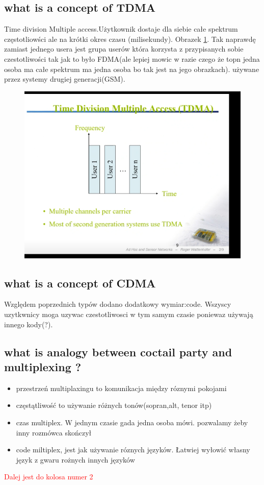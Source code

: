 \subsection{what is a concept of TDMA}
Time division Multiple access.Użytkownik dostaje dla siebie całe spektrum częstotliowści ale na krótki okres czasu (milisekundy). Obrazek \ref{zdj:TDMA}. Tak naprawdę zamiast jednego usera jest grupa userów która korzysta z przypisanych sobie czestotliwości tak jak to było FDMA(ale lepiej mowic w razie czego że topn jedna osoba ma całe spektrum ma jedna osoba bo tak jest na jego obrazkach). używane przez systemy drugiej generacji(GSM). 
\begin{figure}

\caption{}
\label{zdj:TDMA}
\centering
\includegraphics[width=\textwidth]{zdjecia/TDMA}
\end{figure}
\subsection{what is a concept of CDMA}
Względem poprzednich typów dodano dodatkowy wymiar:code. Wszyscy uzytkwnicy moga uzywac czestotliwosci w tym samym czasie poniewaz używają innego kody(?).


\subsection{what is analogy between coctail party and multiplexing ?}

\begin{itemize}
\item przestrzeń multiplaxingu to komunikacja między róznymi pokojami
\item częstątliwość to używanie różnych tonów(sopran,alt, tenor itp)
\item czas multiplex. W jednym czasie gada jedna osoba mówi. pozwalamy żeby inny rozmówca skończył 
\item code miltiplex, jest jak używanie róznych języków. Łatwiej wyłowić własny język z gwaru rożnych innych języków

\end{itemize}
\textcolor{red}{Dalej jest do kolosa numer 2}
